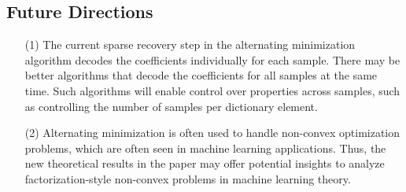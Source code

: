 \subsection{Future Directions}
\begin{enumerate}
\item[(1)] The current sparse recovery step in the alternating minimization algorithm decodes the coefficients individually for each sample. There may be better algorithms that decode the coefficients for all samples at the same time. Such algorithms will enable control over properties across samples, such as controlling the number of samples per dictionary element. 

\item[(2)] Alternating minimization is often used to handle non-convex optimization problems, which are often seen in machine learning applications. Thus, the new theoretical results in the paper may offer potential insights to analyze factorization-style non-convex problems in machine learning theory. 
\end{enumerate}
